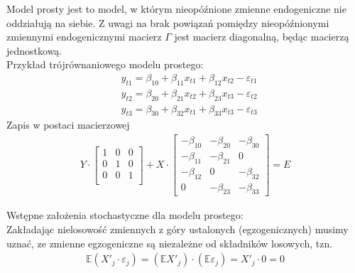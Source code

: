 Model prosty jest to model, w którym nieopóźnione zmienne endogeniczne nie oddziałują na siebie. Z uwagi na brak powiązań pomiędzy nieopóźnionymi zmiennymi endogenicznymi macierz $ \Gamma $ jest macierz diagonalną, będąc macierzą jednostkową.\\
Przykład trójrównaniowego modelu prostego:
\begin{align*}
&y_{t1}=\beta_{10}+\beta_{11}x_{t1}+\beta_{12}x_{t2}-\varepsilon_{t1}\\
&y_{t2}=\beta_{20}+\beta_{21}x_{t2}+\beta_{23}x_{t3}-\varepsilon_{t2}\\
&y_{t3}=\beta_{30}+\beta_{32}x_{t1}+\beta_{33}x_{t3}-\varepsilon_{t3}
\end{align*}
Zapis w postaci macierzowej
\begin{gather*}
Y\cdot
\begin{bmatrix}
 1 & 0 & 0 \\
 0 & 1 & 0 \\
 0 & 0 & 1 \\
\end{bmatrix}
+
X\cdot
\begin{bmatrix}
	-\beta _{10} & -\beta _{20} & -\beta _{30} \\
	-\beta _{11} & -\beta _{21} & 0            \\
	-\beta _{12} & 0            & -\beta _{32} \\
	0            & -\beta _{23} & -\beta _{33}
\end{bmatrix}
=E
\end{gather*}

Wstępne założenia stochastyczne dla modelu prostego:\\
Zakładając nielosowość zmiennych z góry ustalonych (egzogenicznych) musimy uznać, ze zmienne egzogeniczne są niezależne od składników losowych, tzn.
\begin{gather*}
\mathbb E \left(X'_j\cdot \varepsilon_j\right)=\left(\mathbb E X'_j\right)\cdot \left(\mathbb E \varepsilon_j\right)=X'_j\cdot 0=0
\end{gather*}

